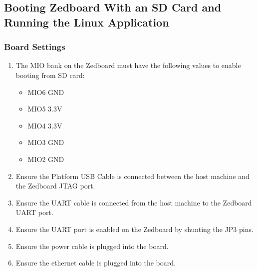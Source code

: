 \subsection{Booting Zedboard With an SD Card and Running the Linux Application}
\subsubsection{Board Settings}
\begin{enumerate}
\item The MIO bank on the Zedboard must have the following values to enable booting from SD card:
\begin{itemize}
\item MIO6 GND
\item MIO5 3.3V
\item MIO4 3.3V
\item MIO3 GND
\item MIO2 GND
\end{itemize}
\item Ensure the Platform USB Cable is connected between the host machine and the Zedboard JTAG port.
\item Ensure the UART cable is connected from the host machine to the Zedboard UART port.
\item Ensure the UART port is enabled on the Zedboard by shunting the JP3 pins.
\item Ensure the power cable is plugged into the board.
\item Ensure the ethernet cable is plugged into the board.
\end{enumerate}
